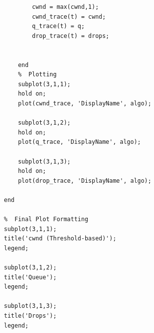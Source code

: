 \documentclass[a4paper,12pt]{article}
\begin{document}
\begin{lstlisting}
        cwnd = max(cwnd,1);
        cwnd_trace(t) = cwnd;
        q_trace(t) = q;
        drop_trace(t) = drops;
        
    
    end
    %  Plotting 
    subplot(3,1,1);
    hold on;
    plot(cwnd_trace, 'DisplayName', algo);

    subplot(3,1,2);
    hold on;
    plot(q_trace, 'DisplayName', algo);

    subplot(3,1,3);
    hold on;
    plot(drop_trace, 'DisplayName', algo);

end

%  Final Plot Formatting 
subplot(3,1,1);
title('cwnd (Threshold-based)');
legend;

subplot(3,1,2);
title('Queue');
legend;

subplot(3,1,3);
title('Drops');
legend;
\end{lstlisting}
\end{document}

